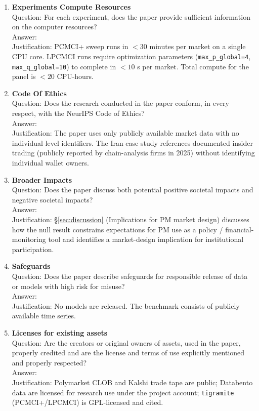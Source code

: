 \documentclass{article}
\begin{document}
\begin{enumerate}
\item {\bf Experiments Compute Resources}\\
Question: For each experiment, does the paper provide sufficient information on the computer resources?\\
Answer: \answerYes{}\\
Justification: PCMCI+ sweep runs in $< 30$ minutes per market on a single CPU core. LPCMCI runs require optimization parameters (\texttt{max\_p\_global=4}, \texttt{max\_q\_global=10}) to complete in $< 10$ s per market. Total compute for the panel is $< 20$ CPU-hours.

\item {\bf Code Of Ethics}\\
Question: Does the research conducted in the paper conform, in every respect, with the NeurIPS Code of Ethics?\\
Answer: \answerYes{}\\
Justification: The paper uses only publicly available market data with no individual-level identifiers. The Iran case study references documented insider trading (publicly reported by chain-analysis firms in 2025) without identifying individual wallet owners.

\item {\bf Broader Impacts}\\
Question: Does the paper discuss both potential positive societal impacts and negative societal impacts?\\
Answer: \answerYes{}\\
Justification: \S\ref{sec:discussion} (Implications for PM market design) discusses how the null result constrains expectations for PM use as a policy / financial-monitoring tool and identifies a market-design implication for institutional participation.

\item {\bf Safeguards}\\
Question: Does the paper describe safeguards for responsible release of data or models with high risk for misuse?\\
Answer: \answerNA{}\\
Justification: No models are released. The benchmark consists of publicly available time series.

\item {\bf Licenses for existing assets}\\
Question: Are the creators or original owners of assets, used in the paper, properly credited and are the license and terms of use explicitly mentioned and properly respected?\\
Answer: \answerYes{}\\
Justification: Polymarket CLOB and Kalshi trade tape are public; Databento data are licensed for research use under the project account; \texttt{tigramite} (PCMCI+/LPCMCI) is GPL-licensed and cited.


\end{enumerate}
\end{document}
